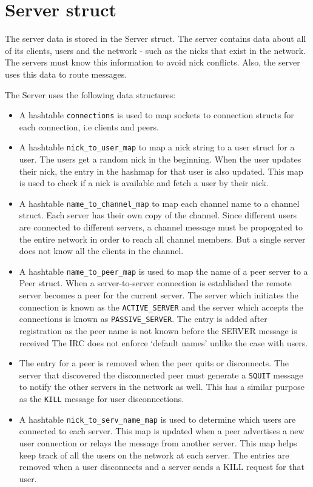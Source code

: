 \documentclass[letterpaper,twocolumn,10pt]{article}
\begin{document}
\section{Server struct}

The server data is stored in the Server struct. The server contains data about
all of its clients, users and the network - such as the nicks that exist in the
network. The servers must know this information to avoid nick conflicts. Also,
the server uses this data to route messages.

The Server uses the following data structures:

\begin{itemize}

	\item A hashtable \verb|connections| is used to map sockets to connection
	      structs
	      for each connection, i.e clients and peers.
	\item A hashtable \verb|nick_to_user_map| to map a nick string to a user
	      struct for
	      a user. The users get a random nick in the beginning. When the user
	      updates
	      their nick, the entry in the hashmap for that user is also updated.
	      This map is used to check if a nick is available and fetch a user by their nick.
	\item A hashtable \verb|name_to_channel_map| to map each channel name to a
	      channel
	      struct. Each server has their own copy of the channel. Since different
	      users
	      are connected to different servers, a channel message must be
	      propogated to the
	      entire network in order to reach all channel members. But a single
	      server does
	      not know all the clients in the channel.
	\item A hashtable \verb|name_to_peer_map| is used to map the name of a peer
	      server
	      to a Peer struct. When a server-to-server connection is established the
	      remote
	      server becomes a peer for the current server. The server which
	      initiates the
	      connection is known as the \verb|ACTIVE_SERVER| and the server which
	      accepts the
	      connections is known as \verb|PASSIVE_SERVER|. The entry is added after
	      registration
	      as the peer name is not known before the SERVER message is received
	      The IRC does not enforce `default names' unlike the case with users.
	\item The entry for a peer is removed when the peer quits or disconnects.
	      The server that
	      discovered
	      the disconnected peer must generate a \verb|SQUIT| message to notify
	      the other
	      servers in the network as well. This has a similar purpose as the
	      \verb|KILL|
	      message for user disconnections.
	\item A hashtable \verb|nick_to_serv_name_map| is used to determine which
	      users are
	      connected to each server. This map is updated when a peer advertises a
	      new user
	      connection or relays the message from another server. This map helps
	      keep track
	      of all the users on the network at each server. The entries are removed
	      when a
	      user disconnects and a server sends a KILL request for that user.


\end{itemize}
\end{document}
